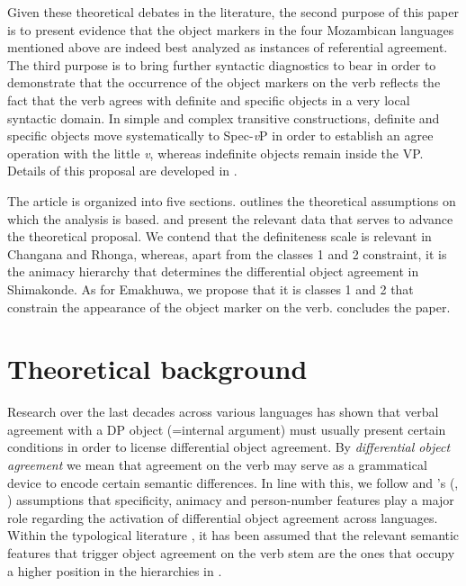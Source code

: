 \documentclass[output=paper]{langsci/langscibook}
\begin{document}
Given these theoretical debates in the literature, the second purpose of this paper is to present evidence that the object markers in the four Mozambican languages mentioned above are indeed best analyzed as instances of referential agreement. The third purpose is to bring further syntactic diagnostics to bear in order to demonstrate that the occurrence of the object markers on the verb reflects the fact that the verb agrees with definite and specific objects in a very local syntactic domain. In simple and complex transitive constructions, definite and specific objects move systematically to Spec-\textit{v}P in order to establish an agree operation with the little {\textit{v}}, whereas indefinite objects remain inside the VP. Details of this proposal are developed in .

The article is organized into five sections.  outlines the theoretical assumptions on which the analysis is based.  and  present the relevant data that serves to advance the theoretical proposal. We contend that the definiteness scale is relevant in Changana and Rhonga, whereas, apart from the classes 1 and 2 constraint, it is the animacy hierarchy that determines the differential object agreement in Shimakonde. As for Emakhuwa, we propose that it is classes 1 and 2 that constrain the appearance of the object marker on the verb.  concludes the paper.

\section{Theoretical background}\label{sec:nguna:2}

Research over the last decades across various languages has shown that verbal agreement with a DP object (=internal argument) must usually present certain conditions in order to license differential object agreement. By \textit{differential object agreement} we mean that agreement on the verb may serve as a grammatical device to encode certain semantic differences. In line with this, we follow  and \citeauthor{Croft1988}’s (\citeyear*{Croft1988}, \citeyear*{Croft1990}) assumptions that specificity, animacy and person-number features play a major role regarding the activation of differential object agreement across languages. Within the typological literature \citep{Givón1976,Comrie1981,Croft1988,Croft1990,Bentley1994}, it has been assumed that the relevant semantic features that trigger object agreement on the verb stem are the ones that occupy a higher position in the hierarchies in .
\end{document}
